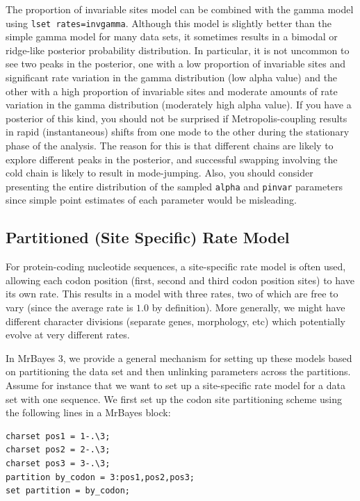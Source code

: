 \documentclass[12pt]{book}
\newcommand{\ttt}[1]{\texttt{#1}}
\begin{document}
The proportion of invariable sites model can be combined with the gamma model using \ttt{lset
rates=invgamma}. Although this model is slightly better than the simple gamma model for many data
sets, it sometimes results in a bimodal or ridge-like posterior probability distribution. In
particular, it is not uncommon to see two peaks in the posterior, one with a low proportion of
invariable sites and significant rate variation in the gamma distribution (low alpha value) and the
other with a high proportion of invariable sites and moderate amounts of rate variation in the
gamma distribution (moderately high alpha value). If you have a posterior of this kind, you should
not be surprised if Metropolis-coupling results in rapid (instantaneous) shifts from one mode to
the other during the stationary phase of the analysis. The reason for this is that different chains
are likely to explore different peaks in the posterior, and successful swapping involving the cold
chain is likely to result in mode-jumping. Also, you should consider presenting the entire
distribution of the sampled \ttt{alpha} and \ttt{pinvar} parameters since simple point estimates of
each parameter would be misleading.

\subsection{Partitioned (Site Specific) Rate Model}

For protein-coding nucleotide sequences, a site-specific rate model is often used, allowing each
codon position (first, second and third codon position sites) to have its own rate. This results in
a model with three rates, two of which are free to vary (since the average rate is $1.0$ by
definition). More generally, we might have different character divisions (separate genes,
morphology, etc) which potentially evolve at very different rates.

In MrBayes 3, we provide a general mechanism for setting up these models based on partitioning the
data set and then unlinking parameters across the partitions. Assume for instance that we want to
set up a site-specific rate model for a data set with one sequence. We first set up the codon site
partitioning scheme using the following lines in a MrBayes block:

\begin{singlespacing}
\small
\begin{verbatim}
charset pos1 = 1-.\3;
charset pos2 = 2-.\3;
charset pos3 = 3-.\3;
partition by_codon = 3:pos1,pos2,pos3;
set partition = by_codon;
\end{verbatim}
\normalsize
\end{singlespacing}
\end{document}
